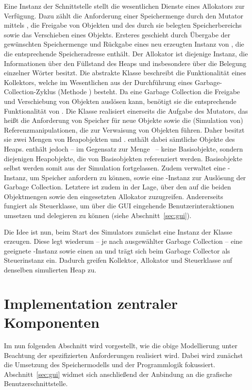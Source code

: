 Eine Instanz der Schnittstelle  stellt die wesentlichen Dienste eines Allokators zur Verfügung.
Dazu zählt die Anforderung einer Speichermenge durch den Mutator mittels , die Freigabe von Objekten und des durch sie belegten Speicherbereichs sowie das Verschieben eines Objekts.
Ersteres geschieht durch Übergabe der gewünschten Speichermenge und Rückgabe eines neu erzeugten Instanz von , die die entsprechende Speicheradresse enthält.
Der Allokator ist diejenige Instanz, die Informationen über den Füllstand des Heaps und insbesondere über die Belegung einzelner Wörter besitzt.
Die abstrakte Klasse  beschreibt die Funktionalität eines Kollektors, welche im Wesentlichen aus der Durchführung eines Garbage-Collection-Zyklus (Methode ) besteht.
Da eine Garbage Collection die Freigabe und Verschiebung von Objekten auslösen kann, benötigt sie die entsprechende Funktionalität von .
Die Klasse  realisiert einerseits die Aufgabe des Mutators, das heißt die Anforderung von Speicher für neue Objekte sowie die (Simulation von) Referenzmanipulationen, die zur Verwaisung von Objekten führen.
Daher besitzt sie zwei Mengen von Heapobjekten  und .
 enthält dabei sämtliche Objekte des Heaps.
 enthält jedoch -- im Gegensatz zur Menge \Roots\ -- keine Basisobjekte, sondern diejenigen Heapobjekte, die von Basisobjekten referenziert werden.
Basisobjekte selbst werden somit aus der Simulation fortgelassen.
Zudem verwaltet  eine -Instanz, um Speicher anfordern zu können, sowie eine -Instanz zur Auslösung der Garbage Collection.
Letztere ist zudem in der Lage, über den  auf die beiden Objektmengen sowie den eingesetzten Allokator zuzugreifen.
Andererseits fungiert  als Steuerklasse, um über die GUI eingehende Benutzerinteraktionen umsetzen und delegieren zu können (siehe Abschnitt~\ref{sec:gui}).

Die Idee ist nun, beim Start des Simulators zunächst eine Instanz der Klasse  erzeugen.
Diese legt wiederum -- je nach ausgewählter Garbage Collection -- eine geeignete -Instanz sowie einen  an und trägt sich beim Garbage Collector als Steuerinstanz ein.
Dadurch greifen Kollektor, Allokator und Steuerklasse auf denselben simulierten Heap zu.

\section{Implementation zentraler Komponenten}
\label{sec:implementation}
Im nun folgenden Abschnitt wird vorgestellt, wie die obige Modellierung unter Beachtung der spezifizierten Anforderungen realisiert wird.
Dabei wird zunächst die Umsetzung des Speichermodells und der Programmlogik fokussiert.
Abschnitt~\ref{sec:gui} widmet sich anschließend der Anbindung an die grafische Benutzerschnittstelle.

